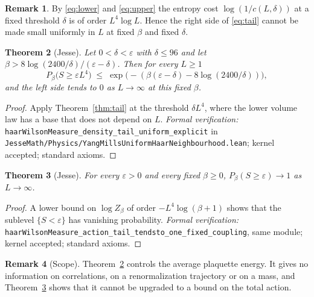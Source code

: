 \documentclass[11pt]{article}
\numberwithin{equation}{subsection}
\theoremstyle{plain}
\newtheorem{theorem}{Theorem}[subsection]
\theoremstyle{definition}
\newtheorem{remark}[theorem]{Remark}
\begin{document}
\begin{remark}
By \eqref{eq:lower} and \eqref{eq:upper} the entropy cost $\log(1/c(L,\delta))$ at a fixed
threshold $\delta$ is of order $L^4\log L$. Hence the right side of \eqref{eq:tail} cannot be
made small uniformly in $L$ at fixed $\beta$ and fixed $\delta$.
\end{remark}

\begin{theorem}[Jesse]\label{thm:density}
Let $0<\delta<\varepsilon$ with $\delta\le 96$ and let $\beta>8\log(2400/\delta)/(\varepsilon-\delta)$.
Then for every $L\ge 1$
\begin{equation}\label{eq:density}
P_\beta\bigl(S\ge\varepsilon L^4\bigr)\;\le\;\exp\!\bigl(-(\beta(\varepsilon-\delta)-8\log(2400/\delta))\bigr),
\end{equation}
and the left side tends to $0$ as $L\to\infty$ at this fixed $\beta$.
\end{theorem}
\begin{proof}
Apply Theorem~\ref{thm:tail} at the threshold $\delta L^4$, where the lower volume law has a
base that does not depend on $L$. \emph{Formal verification:}
\texttt{haar\allowbreak{}Wilson\allowbreak{}Measure\_\allowbreak{}density\_\allowbreak{}tail\_\allowbreak{}uniform\_\allowbreak{}explicit} in
\texttt{Jesse\allowbreak{}Math/\allowbreak{}Physics/\allowbreak{}Yang\allowbreak{}Mills\allowbreak{}Uniform\allowbreak{}Haar\allowbreak{}Neighbourhood.\allowbreak{}lean}; kernel accepted; standard axioms.
\end{proof}

\begin{theorem}[Jesse]\label{thm:one}
For every $\varepsilon>0$ and every fixed $\beta\ge 0$, $P_\beta(S\ge\varepsilon)\to 1$ as $L\to\infty$.
\end{theorem}
\begin{proof}
A lower bound on $\log Z_\beta$ of order $-L^4\log(\beta+1)$ shows that the sublevel
$\{S<\varepsilon\}$ has vanishing probability. \emph{Formal verification:}
\texttt{haar\allowbreak{}Wilson\allowbreak{}Measure\_\allowbreak{}action\_\allowbreak{}tail\_\allowbreak{}tendsto\_\allowbreak{}one\_\allowbreak{}fixed\_\allowbreak{}coupling}, same module; kernel accepted;
standard axioms.
\end{proof}

\begin{remark}[Scope]
Theorem~\ref{thm:density} controls the average plaquette energy. It gives no information on
correlations, on a renormalization trajectory or on a mass, and
Theorem~\ref{thm:one} shows that it cannot be upgraded to a bound on the total action.
\end{remark}
\end{document}
